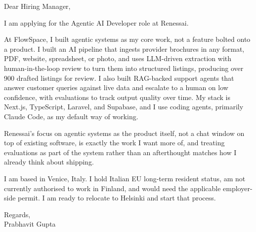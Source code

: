 \documentclass[a4paper,11pt]{article}
\begin{document}
Dear Hiring Manager,

I am applying for the Agentic AI Developer role at Renessai.

At FlowSpace, I built agentic systems as my core work, not a feature bolted onto a product. I built an AI pipeline that ingests provider brochures in any format, PDF, website, spreadsheet, or photo, and uses LLM-driven extraction with human-in-the-loop review to turn them into structured listings, producing over 900 drafted listings for review. I also built RAG-backed support agents that answer customer queries against live data and escalate to a human on low confidence, with evaluations to track output quality over time. My stack is Next.js, TypeScript, Laravel, and Supabase, and I use coding agents, primarily Claude Code, as my default way of working.

Renessai's focus on agentic systems as the product itself, not a chat window on top of existing software, is exactly the work I want more of, and treating evaluations as part of the system rather than an afterthought matches how I already think about shipping.

I am based in Venice, Italy. I hold Italian EU long-term resident status, am not currently authorised to work in Finland, and would need the applicable employer-side permit. I am ready to relocate to Helsinki and start that process.

Regards,\\
Prabhavit Gupta
\end{document}
